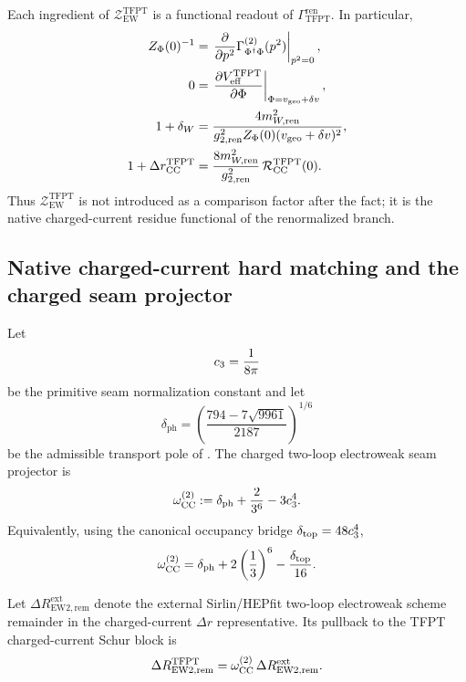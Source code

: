 
\begin{remark}
Each ingredient of $\mathcal Z_{\mathrm{EW}}^{\mathrm{TFPT}}$ is a functional readout of
$\Gamma_{\mathrm{TFPT}}^{\mathrm{ren}}$. In particular,
\[
\begin{aligned}
Z_\Phi(0)^{-1}
&=
\left.\frac{\partial}{\partial p^2}\Gamma_{\Phi^\dagger\Phi}^{(2)}(p^2)\right|_{p^2=0},
\\
0
&=
\left.\frac{\partial V_{\mathrm{eff}}^{\mathrm{TFPT}}}{\partial \Phi}\right|_{\Phi=v_{\mathrm{geo}}+\delta v},
\\
1+\delta_W
&=
\frac{4m_{W,\mathrm{ren}}^2}
{g_{2,\mathrm{ren}}^2Z_\Phi(0)(v_{\mathrm{geo}}+\delta v)^2},
\\
1+\Delta r_{\mathrm{CC}}^{\mathrm{TFPT}}
&=
\frac{8m_{W,\mathrm{ren}}^2}{g_{2,\mathrm{ren}}^2}\,
\mathcal R_{\mathrm{CC}}^{\mathrm{TFPT}}(0).
\end{aligned}
\]
Thus $\mathcal Z_{\mathrm{EW}}^{\mathrm{TFPT}}$ is not introduced as a comparison factor after the
fact; it is the native charged-current residue functional of the renormalized branch.
\end{remark}


\subsection{Native charged-current hard matching and the charged seam projector}

\begin{definition}
\label{def:charged-ew2-seam-projector}
Let
\[
c_3=\frac{1}{8\pi}
\]
be the primitive seam normalization constant and let
\[
\delta_{\mathrm{ph}}
=
\left(
\frac{794-7\sqrt{9961}}{2187}
\right)^{1/6}
\]
be the admissible transport pole of . The charged two-loop
electroweak seam projector is
\begin{equation}
\label{eq:charged-ew2-seam-projector}
\omega_{\mathrm{CC}}^{(2)}
:=
\delta_{\mathrm{ph}}
+
\frac{2}{3^6}
-
3c_3^4.
\end{equation}
Equivalently, using the canonical occupancy bridge $\delta_{\mathrm{top}}=48c_3^4$,
\[
\omega_{\mathrm{CC}}^{(2)}
=
\delta_{\mathrm{ph}}
+
2\left(\frac13\right)^6
-
\frac{\delta_{\mathrm{top}}}{16}.
\]
\end{definition}

\begin{lemma}
\label{lem:charged-seam-projector-ew2}
Let $\Delta R_{\mathrm{EW2},\mathrm{rem}}^{\mathrm{ext}}$ denote the external
Sirlin/HEPfit two-loop electroweak scheme remainder in the charged-current
$\Delta r$ representative. Its pullback to the TFPT charged-current Schur block is
\begin{equation}
\label{eq:charged-seam-ew2-pullback}
\Delta R_{\mathrm{EW2},\mathrm{rem}}^{\mathrm{TFPT}}
=
\omega_{\mathrm{CC}}^{(2)}\,
\Delta R_{\mathrm{EW2},\mathrm{rem}}^{\mathrm{ext}}.
\end{equation}
\end{lemma}


